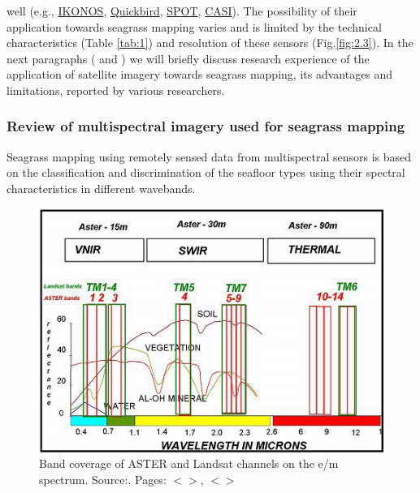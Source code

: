 \documentclass[11pt]{article}
\begin{document}
well (e.g., \href{http://www.satimagingcorp.com/gallery-ikonos.html}{IKONOS}, \href{http://www.digitalglobe.com/index.php/85/QuickBird}{Quickbird}, \href{http://www.spotimage.fr/}{SPOT}, \href{http://www.itres.com/products/imagers/casi550}{CASI}). The possibility of their application towards seagrass mapping varies and is limited by the technical characteristics (Table \ref{tab:1}) and resolution of these sensors  (Fig.\ref{fig:2.3}).
In the next paragraphs ( and ) we will briefly discuss research experience of the application of satellite imagery towards seagrass mapping, its advantages and limitations, reported by various researchers.

\subsubsection[Review of multispectral imagery used for seagrass mapping]{Review of multispectral imagery used for seagrass mapping}\label{sec:2.4.1}

Seagrass mapping using remotely sensed data\label{page-18} from multispectral sensors is based on the classification
and discrimination of the seafloor types using their spectral characteristics in different wavebands.

\begin{figure}
	\centering
	\includegraphics[scale=0.35]{Fig-13.jpg}
 	\caption{Band coverage of ASTER and Landsat channels on the e/m spectrum. Source:\cite{Kalinowski04}\label{Kalinowski04}. Pages: $<$\pageref{page-18}$>$, $<$\pageref{page-19}$>$}
	\label{fig:2.4}
\end{figure}
\end{document}
